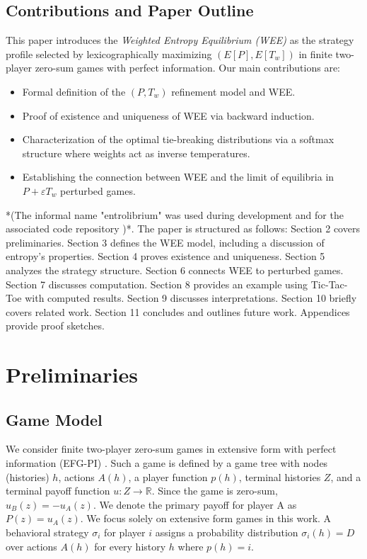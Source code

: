 \documentclass{article}
\begin{document}
\subsection{Contributions and Paper Outline}
This paper introduces the \emph{Weighted Entropy Equilibrium (WEE)} as the strategy profile selected by lexicographically maximizing $(E[P], E[T_w])$ in finite two-player zero-sum games with perfect information. Our main contributions are:
\begin{itemize}
    \item Formal definition of the $(P, T_w)$ refinement model and WEE.
    \item Proof of existence and uniqueness of WEE via backward induction.
    \item Characterization of the optimal tie-breaking distributions via a softmax structure where weights act as inverse temperatures.
    \item Establishing the connection between WEE and the limit of equilibria in $P + \varepsilon T_w$ perturbed games.
\end{itemize}
*(The informal name "entrolibrium" was used during development and for the associated code repository \cite{placeholder_repo})*.
The paper is structured as follows: Section 2 covers preliminaries. Section 3 defines the WEE model, including a discussion of entropy's properties. Section 4 proves existence and uniqueness. Section 5 analyzes the strategy structure. Section 6 connects WEE to perturbed games. Section 7 discusses computation. Section 8 provides an example using Tic-Tac-Toe with computed results. Section 9 discusses interpretations. Section 10 briefly covers related work. Section 11 concludes and outlines future work. Appendices provide proof sketches.

\section{Preliminaries}

\subsection{Game Model}
We consider finite two-player zero-sum games in extensive form with perfect information (EFG-PI) \cite{placeholder_osborne_rubinstein}. Such a game is defined by a game tree with nodes (histories) $h$, actions $A(h)$, a player function $p(h)$, terminal histories $Z$, and a terminal payoff function $u: Z \to \mathbb{R}$. Since the game is zero-sum, $u_B(z) = -u_A(z)$. We denote the primary payoff for player A as $P(z) = u_A(z)$. We focus solely on extensive form games in this work. A behavioral strategy $\sigma_i$ for player $i$ assigns a probability distribution $\sigma_i(h) = D$ over actions $A(h)$ for every history $h$ where $p(h) = i$.
\end{document}
